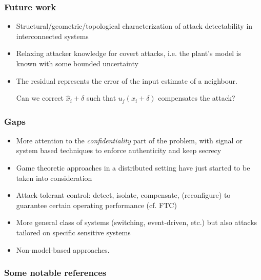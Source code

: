 \documentclass[presentation]{beamer}
\begin{document}

\begin{frame}
	\frametitle{Future work}
	\begin{itemize}
		\setlength{\itemsep}{1.5ex}
		\item<1-> Structural/geometric/topological characterization of attack detectability in interconnected systems
		
		\item<2-> Relaxing attacker knowledge for covert attacks, i.e. the plant's model is known with some bounded uncertainty
		
		\item<3> The residual represents the error of the input estimate of a neighbour.
		
		Can we correct $\hat x_i + \delta$ such that $u_j(x_i + \delta)$ compensates the attack?
	\end{itemize}
\end{frame}

\begin{frame}
	\frametitle{Gaps}	
	\begin{itemize}
		\setlength{\itemsep}{1.5ex}
		\item<1-> More attention to the \emph{confidentiality} part of the problem, with signal or system based techniques to enforce authenticity and keep secrecy
		
		\item<2-> Game theoretic approaches in a distributed setting have just started to be taken into consideration
	
		\item<3-> Attack-tolerant control: detect, isolate, compensate, (reconfigure) to guarantee certain operating performance (cf. FTC)
		
		\item<4-> More general class of systems (switching, event-driven, etc.) but also attacks tailored on specific sensitive systems
		
		\item<5> Non-model-based approaches. 
	\end{itemize}
\end{frame}
 
\begin{frame}
	\frametitle{Some notable references}
	\nocite{*}
	\printbibliography
\end{frame}
\end{document}
